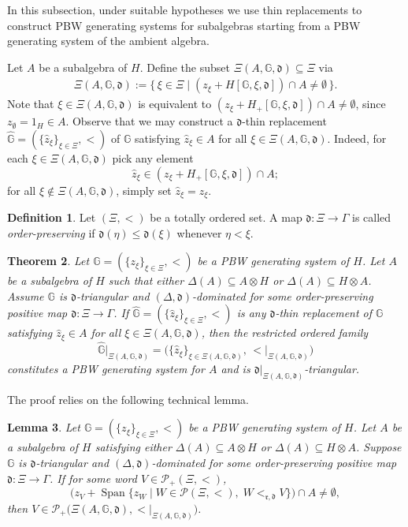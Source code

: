 \documentclass{article}
\theoremstyle{plain}
\newtheorem{thm}{Theorem}[section]
\newtheorem{lemma}[thm]{Lemma}
\theoremstyle{definition}
\newtheorem{definition}[thm]{Definition}
\numberwithin{equation}{section}
\DeclareMathOperator{\Span}{Span}
\newcommand{\GG}{\mathbb{G}}
\newcommand{\dd}{\mathfrak{d}}
\newcommand{\rr}{\mathfrak{r}}
\begin{document}
	In this subsection, under suitable hypotheses we use thin replacements to construct PBW generating systems for subalgebras starting from a PBW generating system  of the ambient algebra.
	
	Let $A$ be a subalgebra of $H$. Define the subset $\Xi(A,\GG,\dd)\subseteq\Xi$ via
	\begin{eqnarray}\label{sub-index-set}
		\Xi(A,\GG,\dd):=\{\,\xi\in\Xi\mid (z_{\xi}+H[\GG,\xi,\dd]) \cap  A \neq \emptyset \,\}.
	\end{eqnarray}
	Note that $\xi \in \Xi(A,\GG,\dd)$ is equivalent to $(z_{\xi}+H_{+}[\GG,\xi,\dd]) \cap  A \neq \emptyset$, since $z_{\emptyset}=1_{H} \in A$. Observe that we may construct a $\dd$-thin replacement $\hat{\GG}=(\{\hat{z}_{\xi}\}_{\xi \in \Xi}, <)$ of $\GG$ satisfying $\hat{z}_{\xi} \in A$ for all $\xi\in \Xi(A,\GG,\dd)$. Indeed, for each $\xi\in \Xi(A,\GG,\dd)$ pick any element
	\[
	\hat{z}_{\xi}\in (z_{\xi}+H_{+}[\GG,\xi,\dd]) \cap  A;
	\]
	for all $\xi\notin \Xi(A,\GG,\dd)$, simply set $\hat{z}_{\xi}=z_{\xi}$.
	
	\begin{definition}
		Let $(\Xi,<)$ be a totally ordered set. A map $\dd\colon\Xi\to \Gamma$ is called \emph{order-preserving} if $\dd(\eta)\leq \dd(\xi)$ whenever $\eta< \xi$.
	\end{definition}
	
	\begin{thm}\label{PBW-sub-hereditary}
		Let $\GG=(\{z_{\xi}\}_{\xi\in \Xi}, <)$ be a PBW generating system of $H$.  Let $A$ be a subalgebra of $H$ such that  either $\Delta(A)\subseteq A\otimes H$ or $\Delta(A)\subseteq H\otimes A$.  Assume $\GG$ is $\dd$-triangular and $(\Delta,\dd)$-dominated for some order-preserving positive map $\dd\colon\Xi\to \Gamma$. 
		If $\hat{\mathbb{G}}=(\{\hat{z}_{\xi}\}_{\xi\in \Xi},<)$ is any $\dd$-thin replacement of $\mathbb{G}$ satisfying $\hat{z}_{\xi}\in A$ for all $\xi\in \Xi(A,\mathbb{G},\dd)$,
		then the restricted ordered family
		\[
		\hat{\mathbb{G}}\big|_{\Xi(A,\mathbb{G},\dd)}
		=\bigl(\{\hat{z}_{\xi}\}_{\xi\in \Xi(A,\mathbb{G},\dd)},\,{<}\big|_{\Xi(A,\mathbb{G},\dd)}\bigr)
		\]
		constitutes a PBW generating system for $A$ and is $\dd\big|_{\Xi(A,\mathbb{G},\dd)}$-triangular.
	\end{thm}
	
	The proof relies on the following technical lemma.
	
	\begin{lemma}\label{index-set-induced}
		Let $\GG=(\{z_{\xi}\}_{\xi\in \Xi}, <)$ be a PBW generating system of $H$. Let $A$ be a subalgebra of $H$ satisfying either $\Delta(A)\subseteq A\otimes H$ or $\Delta(A)\subseteq H\otimes A$. Suppose $\GG$ is $\dd$-triangular and $(\Delta,\dd)$-dominated for some order-preserving positive map $\dd\colon\Xi\to \Gamma$.  If for some word
		$V\in \mathcal{P}_{+}(\Xi, <)$,
		\[
		\big ( z_{V} + \Span\{z_{W} \mid W\in \mathcal{P}(\Xi, <),\; W<_{\rr,\dd} V\} \big) \cap A\neq \emptyset,
		\]
		then  $V\in \mathcal{P}_{+}\big(\Xi(A,\GG,\dd), {<}|_{\Xi(A,\GG,\dd)}\big)$.
	\end{lemma}
	
\end{document}
